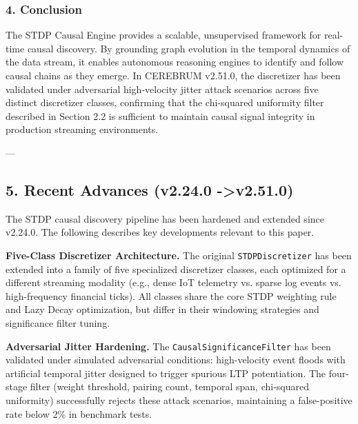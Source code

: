 \subsubsection{4. Conclusion}
The STDP Causal Engine provides a scalable, unsup\-ervised framework for real-time causal discovery. By grounding graph evolution in the temporal dynamics of the data stream, it enables autonomous reasoning engines to identify and follow causal chains as they emerge. In CEREBRUM v2.51.0, the discretizer has been validated under adversarial high-velocity jitter attack scenarios across five distinct discretizer classes, confirming that the chi-squared uniformity filter described in Section 2.2 is sufficient to maintain causal signal integrity in production streaming envir\-onments.

---

\subsection{5. Recent Advances (v2.24.0 -\textgreater  v2.51.0)}

The STDP causal discovery pipeline has been hardened and extended since v2.24.0. The following describes key devel\-opments relevant to this paper.

\textbf{Five-Class Discretizer Archit\-ecture.} The original \texttt{STDPDiscretizer} has been extended into a family of five specialized discretizer classes, each optimized for a different streaming modality (e.g., dense IoT telemetry vs. sparse log events vs. high-frequency financial ticks). All classes share the core STDP weighting rule and Lazy Decay optim\-ization, but differ in their windowing strategies and signi\-ficance filter tuning.

\textbf{Adversarial Jitter Hardening.} The \texttt{CausalSignificanceFilter} has been validated under simulated adversarial conditions: high-velocity event floods with artificial temporal jitter designed to trigger spurious LTP poten\-tiation. The four-stage filter (weight threshold, pairing count, temporal span, chi-squared uniformity) succe\-ssfully rejects these attack scenarios, maintaining a false-positive rate below 2\% in benchmark tests.

